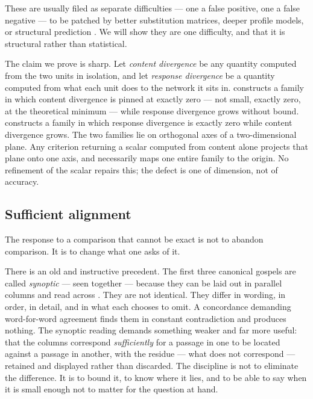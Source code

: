 \documentclass[11pt,twocolumn,a4paper]{article}
\theoremstyle{plain}
\theoremstyle{definition}
\theoremstyle{remark}
\begin{document}
These are usually filed as separate difficulties --- one a false
positive, one a false negative --- to be patched by better substitution
matrices, deeper profile models, or structural prediction
\cite{henikoff1992amino,eddy2011accelerated,jumper2021highly}. We will
show they are one difficulty, and that it is structural rather than
statistical.

The claim we prove is sharp. Let \emph{content divergence} be any
quantity computed from the two units in isolation, and let
\emph{response divergence} be a quantity computed from what each unit
does to the network it sits in.  constructs a
family in which content divergence is pinned at exactly zero --- not
small, exactly zero, at the theoretical minimum --- while response
divergence grows without bound.  constructs a family
in which response divergence is exactly zero while content divergence
grows. The two families lie on orthogonal axes of a two-dimensional
plane. Any criterion returning a scalar computed from content alone
projects that plane onto one axis, and necessarily maps one entire
family to the origin. No refinement of the scalar repairs this; the
defect is one of dimension, not of accuracy.

\subsection{Sufficient alignment}
\label{sec:sufficient}

The response to a comparison that cannot be exact is not to abandon
comparison. It is to change what one asks of it.

There is an old and instructive precedent. The first three canonical
gospels are called \emph{synoptic} --- seen together --- because they
can be laid out in parallel columns and read across
\cite{griesbach1776synopsis,throckmorton1949gospel}. They are not
identical. They differ in wording, in order, in detail, and in what each
chooses to omit. A concordance demanding word-for-word agreement finds
them in constant contradiction and produces nothing. The synoptic
reading demands something weaker and far more useful: that the columns
correspond \emph{sufficiently} for a passage in one to be located
against a passage in another, with the residue --- what does not
correspond --- retained and displayed rather than discarded. The
discipline is not to eliminate the difference. It is to bound it, to
know where it lies, and to be able to say when it is small enough not to
matter for the question at hand.
\end{document}
